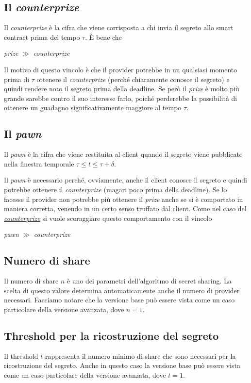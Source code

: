 \subsection{Il \textit{counterprize}}
\label{subsec:counterprize}
Il \textit{counterprize} è la cifra che viene corrisposta a chi invia il segreto
allo smart contract prima del tempo $ \tau $. È bene che
\begin{center}
	\textit{prize} $ \gg $ \textit{counterprize}
\end{center}
Il motivo di questo vincolo è che il provider potrebbe in un qualsiasi momento
prima di $ \tau $ ottenere
il \textit{counterprize} (perché chiaramente conosce il segreto) e quindi
rendere noto il segreto prima della deadline. Se però il
\textit{prize} è molto più grande sarebbe contro il suo
interesse farlo,
poiché perderebbe la possibilità di ottenere un guadagno significativamente
maggiore al tempo $ \tau $.

\subsection{Il \textit{pawn}}
Il \textit{pawn} è la cifra che viene restituita al client quando il segreto
viene pubblicato nella finestra temporale $ \tau \leq t \leq \tau + \delta $.

Il \textit{pawn} è necessario perché, ovviamente, anche il client conosce il segreto
e quindi potrebbe ottenere il \textit{counterprize} (magari poco prima della deadline).
Se lo facesse il provider non potrebbe più ottenere il \textit{prize} anche se si è
comportato in maniera corretta, venendo in un certo senso truffato dal client.
Come nel caso del \hyperref[subsec:counterprize]{\textit{counterprize}}
si vuole scoraggiare questo comportamento con il vincolo
\begin{center}
	\textit{pawn} $ \gg $ \textit{counterprize}
\end{center}

\subsection{Numero di share}
Il numero di share $ n $ è uno dei parametri
dell'algoritmo di secret sharing.
La scelta di questo valore determina automaticamente anche il numero di provider
necessari.
Facciamo notare che la versione base può essere vista come un caso particolare
della versione avanzata, dove $ n = 1 $.

\subsection{Threshold per la ricostruzione del segreto}
Il threshold $ t $ rappresenta il numero minimo di share che
sono necessari per la ricostruzione del segreto.
Anche in questo caso la versione base può essere vista come un caso particolare
della versione avanzata, dove $ t = 1 $.

